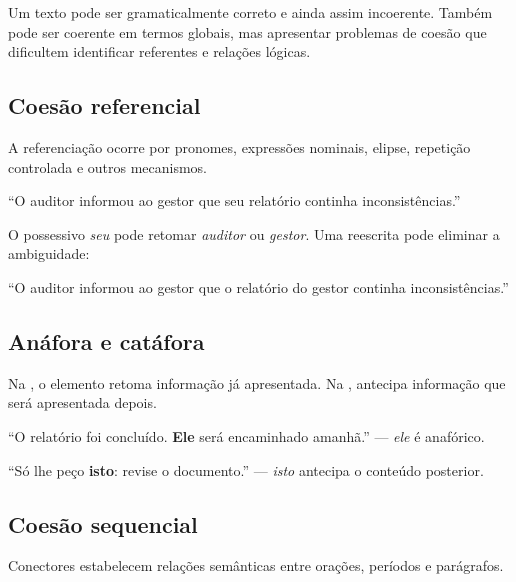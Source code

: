 Um texto pode ser gramaticalmente correto e ainda assim incoerente. Também pode ser coerente em termos globais, mas apresentar problemas de coesão que dificultem identificar referentes e relações lógicas.

\subsection{Coesão referencial}

A referenciação ocorre por pronomes, expressões nominais, elipse, repetição controlada e outros mecanismos.

\begin{exemplo}
``O auditor informou ao gestor que seu relatório continha inconsistências.''

O possessivo \emph{seu} pode retomar \emph{auditor} ou \emph{gestor}. Uma reescrita pode eliminar a ambiguidade:

``O auditor informou ao gestor que o relatório do gestor continha inconsistências.''
\end{exemplo}

\subsection{Anáfora e catáfora}

Na , o elemento retoma informação já apresentada. Na , antecipa informação que será apresentada depois.

``O relatório foi concluído. \textbf{Ele} será encaminhado amanhã.'' — \emph{ele} é anafórico.

``Só lhe peço \textbf{isto}: revise o documento.'' — \emph{isto} antecipa o conteúdo posterior.

\subsection{Coesão sequencial}

Conectores estabelecem relações semânticas entre orações, períodos e parágrafos.

